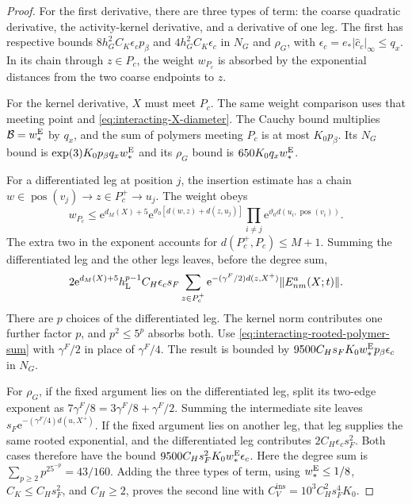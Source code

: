\documentclass[11pt,letterpaper,reqno]{amsart}
\begin{document}
\begin{proof}
For the first derivative, there are three
types of term: the coarse quadratic derivative,
the activity-kernel derivative, and a derivative
of one leg. The first has respective bounds
$8h_G^2C_K\epsilon_cp_\beta$ and
$4h_G^2C_K\epsilon_c$ in $N_G$ and $\rho_G$,
with $\epsilon_c=e_*|\widehat c_c|_\infty\le q_x$.
In its chain through $z\in P_c$, the weight
$w_{P_c}$ is absorbed by the exponential
distances from the two coarse endpoints to $z$.

For the kernel derivative, $X$ must meet $P_c$.
The same weight comparison uses that meeting
point and \eqref{eq:interacting-X-diameter}.
The Cauchy bound multiplies
$\mathcal B=w_*^{\rm E}$ by $q_x$, and
the sum of polymers meeting $P_c$ is at most
$K_0p_\beta$. Its $N_G$ bound is
$\exp(3)K_0p_\beta q_xw_*^{\rm E}$ and its
$\rho_G$ bound is $650K_0q_xw_*^{\rm E}$.

For a differentiated leg at position $j$, the
insertion estimate has a chain
$w\in\operatorname{pos}(v_j)\to z\in P_c^+\to u_j$.
The weight obeys
\[
 w_{P_c}\le \mathrm e^{d_M(X)+5}
 \mathrm e^{\vartheta_0[d(w,z)+d(z,u_j)]}
            \prod_{i\ne j}\mathrm e^{\vartheta_0d(u_i,\operatorname{pos}(v_i))}.
\]
The extra two in the exponent accounts for
$d(P_c^+,P_c)\le M+1$.
Summing the differentiated leg and the other
legs leaves, before the degree sum,
\[
 2\mathrm e^{d_M(X)+5}h_{\rm L}^{p-1}
       C_H\epsilon_cs_F
       \sum_{z\in P_c^+}\mathrm e^{-(\gamma^F/2)d(z,X^+)}
                                      \|E^a_{nm}(X;t)\|.
\]
There are $p$ choices of the differentiated
leg. The kernel norm contributes one further
factor $p$, and $p^2\le5^p$ absorbs both.
Use \eqref{eq:interacting-rooted-polymer-sum}
with $\gamma^F/2$ in place of $\gamma^F/4$.
The result is bounded by
$9500C_Hs_FK_0w_*^{\rm E}p_\beta\epsilon_c$
in $N_G$.

For $\rho_G$, if the fixed argument lies on
the differentiated leg, split its two-edge
exponent as $7\gamma^F/8=3\gamma^F/8+\gamma^F/2$.
Summing the intermediate site leaves
$s_F\mathrm e^{-(\gamma^F/4)d(u,X^+)}$.
If the fixed argument lies on another leg,
that leg supplies the same rooted exponential,
and the differentiated leg contributes
$2C_H\epsilon_cs_F^2$.
Both cases therefore have the bound
$9500C_Hs_F^2K_0w_*^{\rm E}\epsilon_c$.
Here the degree sum is
$\sum_{p\ge2}p^25^{-p}=43/160$.
Adding the three types of term, using
$w_*^{\rm E}\le1/8$, $C_K\le C_Hs_F^2$,
and $C_H\ge2$, proves the second line with
$C_V^{\mathrm{ins}}=10^3C_H^2s_F^4K_0$.


\end{proof}
\end{document}
